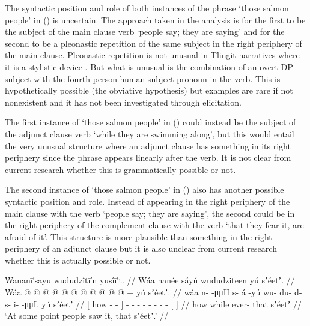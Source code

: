 The syntactic position and role of both instances of the phrase  ‘those salmon people’ in (\lastx) is uncertain.
The approach taken in the analysis is for the first to be the subject of the main clause verb  ‘people say; they are saying’ and for the second to be a pleonastic repetition of the same subject in the right periphery of the main clause.
Pleonastic repetition is not unusual in Tlingit narratives where it is a stylistic device \parencite[15–19]{dauenhauer:1987}.
But what is unusual is the combination of an overt DP subject with the fourth person human  subject pronoun in the verb.
This is hypothetically possible (the obviative  hypothesis) but examples are rare if not nonexistent and it has not been investigated through elicitation.

The first instance of  ‘those salmon people’ in (\lastx) could instead be the subject of the adjunct clause verb  ‘while they are swimming along’, but this would entail the very unusual structure where an adjunct clause has something in its right periphery since the phrase appears linearly after the verb.
It is not clear from current research whether this is grammatically possible or not.

The second instance of  ‘those salmon people’ in (\lastx) also has another possible syntactic position and role.
Instead of appearing in the right periphery of the main clause with the verb  ‘people say; they are saying’, the second  could be in the right periphery of the complement clause with the verb  ‘that they fear it, are afraid of it’.
This structure is more plausible than something in the right periphery of an adjunct clause but it is also unclear from current research whether this is actually possible or not.

\ex\label{ex:100-85-saw-the-seet}%
%
\begingl
	\glpreamble	Wananī′sayu wududzîtī′n yusîī′t. //
	\glpreamble	Wáa nanée sáyú wududziteen yú sʼéetʼ. //
	\gla	{} Wáa  @ {} @ {} @ {} {}  @ {} @ {} 
		 @ {} @ {} @ {} @ {} @ {} @ {} +
		{} yú sʼéetʼ. {} //
	\glb	{} wáa n-  -μμH {} {} s- á -yú
		wu- du- d- s- i-  -μμL
		{} yú sʼéetʼ {} //
	\glc	{}[ how -  - \· {}] -  -
		- - - - -  -
		{}[   {}] //
	\gld	{} how  {} {} \·while {} ever-  {} 
		 {} {} {} {} {} {}
		{} that sʼéetʼ {} //
	\glft	‘At some point people saw it, that sʼéetʼ.’
\endgl		//

